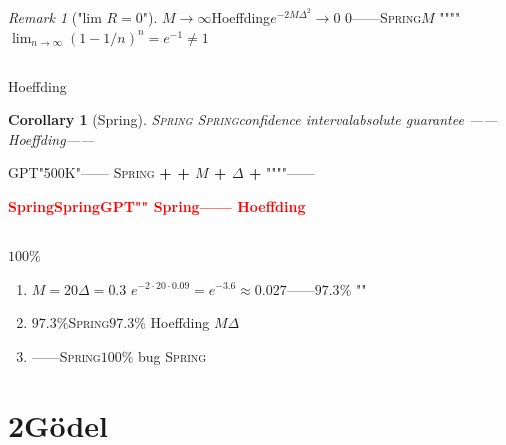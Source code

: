 \documentclass[12pt,a4paper]{article}
\newtheorem{corollary}[theorem]{Corollary}
\theoremstyle{remark}
\newtheorem{remark}[theorem]{Remark}
\newcommand{\Spring}{\textsc{Spring}}
\newcommand{\honestcrit}[1]{%
    \textcolor{red}{\textbf{#1}}%
}
\begin{document}
\begin{remark}["lim $R=0$"]
$M \to \infty$Hoeffding$e^{-2M\Delta^2} \to 0$
\textbf{}0——\Spring{}$M$
""""
$\lim_{n\to\infty} (1 - 1/n)^n = e^{-1} \neq 1$
\end{remark}

\subsection{}

Hoeffding

\begin{corollary}[Spring]\label{cor:uncertainty}
\Spring{}
\Spring{}\textbf{}confidence interval\textbf{}absolute guarantee
——Hoeffding——
\end{corollary}



\begin{center}
\end{center}

GPT"500K"——
\Spring{}\textbf{ +  + $M$ + $\Delta$ + }
""""——
\textbf{}

\honestcrit{SpringSpringGPT""
Spring——
Hoeffding}

\subsection{}

$100\%$



\begin{enumerate}[label=(\arabic*), itemsep=4pt]
    \item \textbf{} $M=20$$\Delta=0.3$
    $e^{-2\cdot 20 \cdot 0.09} = e^{-3.6} \approx 0.027$——$97.3\%$
    ""
    
    \item \textbf{} $97.3\%$\Spring{}\textbf{}$97.3\%$
    Hoeffding
    $M$$\Delta$
    
    
    \item \textbf{} ——\Spring{}$100\%$
    bug
    \Spring{}
\end{enumerate}

\newpage

\section{2G\"odel}
\end{document}
